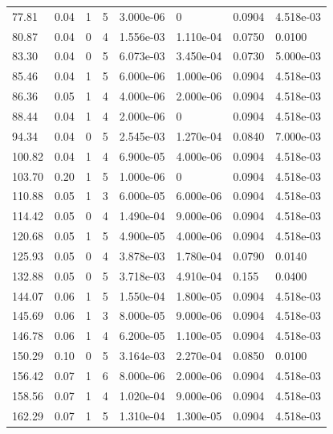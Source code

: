 \documentclass[preview]{standalone}
\begin{document}
{{\begin{tabular}{L{1.2cm}C{1.2cm} C{0.3cm}C{0.5cm} C{1.4cm}C{1.4cm} C{1.4cm}C{1.4cm}}
  77.81  &  0.04  & 1     &  5 &  3.000e-06  & 0  & 0.0904 &  4.518e-03   \\ 
  80.87  &  0.04  & 0     &  4 &  1.556e-03  & 1.110e-04  & 0.0750 &  0.0100   \\ 
  83.30  &  0.04  & 0     &  5 &  6.073e-03  & 3.450e-04  & 0.0730 &  5.000e-03   \\ 
  85.46  &  0.04  & 1     &  5 &  6.000e-06  & 1.000e-06  & 0.0904 &  4.518e-03   \\ 
  86.36  &  0.05  & 1     &  4 &  4.000e-06  & 2.000e-06  & 0.0904 &  4.518e-03   \\ 
  88.44  &  0.04  & 1     &  4 &  2.000e-06  & 0  & 0.0904 &  4.518e-03   \\ 
  94.34  &  0.04  & 0     &  5 &  2.545e-03  & 1.270e-04  & 0.0840 &  7.000e-03   \\ 
  100.82  &  0.04  & 1     &  4 &  6.900e-05  & 4.000e-06  & 0.0904 &  4.518e-03   \\ 
  103.70  &  0.20  & 1     &  5 &  1.000e-06  & 0  & 0.0904 &  4.518e-03   \\ 
  110.88  &  0.05  & 1     &  3 &  6.000e-05  & 6.000e-06  & 0.0904 &  4.518e-03   \\ 
  114.42  &  0.05  & 0     &  4 &  1.490e-04  & 9.000e-06  & 0.0904 &  4.518e-03   \\ 
  120.68  &  0.05  & 1     &  5 &  4.900e-05  & 4.000e-06  & 0.0904 &  4.518e-03   \\ 
  125.93  &  0.05  & 0     &  4 &  3.878e-03  & 1.780e-04  & 0.0790 &  0.0140   \\ 
  132.88  &  0.05  & 0     &  5 &  3.718e-03  & 4.910e-04  & 0.155 &  0.0400   \\ 
  144.07  &  0.06  & 1     &  5 &  1.550e-04  & 1.800e-05  & 0.0904 &  4.518e-03   \\ 
  145.69  &  0.06  & 1     &  3 &  8.000e-05  & 9.000e-06  & 0.0904 &  4.518e-03   \\ 
  146.78  &  0.06  & 1     &  4 &  6.200e-05  & 1.100e-05  & 0.0904 &  4.518e-03   \\ 
  150.29  &  0.10  & 0     &  5 &  3.164e-03  & 2.270e-04  & 0.0850 &  0.0100   \\ 
  156.42  &  0.07  & 1     &  6 &  8.000e-06  & 2.000e-06  & 0.0904 &  4.518e-03   \\ 
  158.56  &  0.07  & 1     &  4 &  1.020e-04  & 9.000e-06  & 0.0904 &  4.518e-03   \\ 
  162.29  &  0.07  & 1     &  5 &  1.310e-04  & 1.300e-05  & 0.0904 &  4.518e-03   \\ 

\end{tabular}}}
\end{document}

